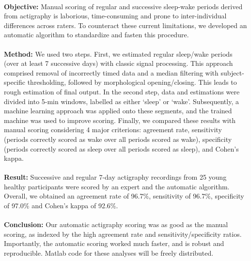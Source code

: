 \documentclass[a4paper,12pt]{article}
\begin{document}
\paragraph{}
\textbf{Objective:} Manual scoring of regular and successive sleep-wake periods derived from actigraphy is laborious, time-consuming and prone to inter-individual differences across raters. To counteract these current limitations, we developed an automatic algorithm to standardize and fasten this procedure.

\paragraph{}
\textbf{Method:} We used two steps. First, we estimated regular sleep/wake periods (over at least 7 successive days) with classic signal processing. This approach comprised removal of incorrectly timed data and a median filtering with subject-specific thresholding, followed by morphological opening/closing. This leads to rough estimation of final output. In the second step, data and estimations were divided into 5-min windows, labelled as either ‘sleep’ or ‘wake’. Subsequently, a machine learning approach was applied onto these segments, and the trained machine was used to improve scoring. Finally, we compared these results with manual scoring considering 4 major criterions: agreement rate, sensitivity (periods correctly scored as wake over all periods scored as wake), specificity (periods correctly scored as sleep over all periods scored as sleep), and Cohen's kappa.

\paragraph{}
\textbf{Result:} Successive and regular 7-day actigraphy recordings from 25 young healthy participants were scored by an expert and the automatic algorithm. Overall, we obtained an agreement rate of 96.7\%, sensitivity of 96.7\%, specificity of 97.0\% and Cohen's kappa of 92.6\%.

\paragraph{}
\textbf{Conclusion:} Our automatic actigraphy scoring was as good as the manual scoring, as indexed by the high agreement rate and sensitivity/specificity ratios. Importantly, the automatic scoring worked much faster, and is robust and reproducible. Matlab code for these analyses will be freely distributed.
\newpage
\end{document}
